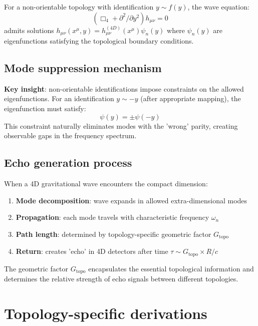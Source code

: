\documentclass[12pt]{iopart}
\begin{document}
For a non-orientable topology with identification $y \sim f(y)$, the wave equation:
\begin{equation}
(\Box_4 + \partial^2/\partial y^2)h_{\mu\nu} = 0
\end{equation}
admits solutions $h_{\mu\nu}(x^\mu, y) = h_{\mu\nu}^{(4D)}(x^\mu) \psi_n(y)$ where $\psi_n(y)$ are eigenfunctions satisfying the topological boundary conditions.

\subsection{Mode suppression mechanism}

\textbf{Key insight}: non-orientable identifications impose constraints on the allowed eigenfunctions. For an identification $y \sim -y$ (after appropriate mapping), the eigenfunction must satisfy:
\begin{equation}
\psi(y) = \pm\psi(-y)
\end{equation}
This constraint naturally eliminates modes with the 'wrong' parity, creating observable gaps in the frequency spectrum.

\subsection{Echo generation process}

When a 4D gravitational wave encounters the compact dimension:
\begin{enumerate}
\item \textbf{Mode decomposition}: wave expands in allowed extra-dimensional modes
\item \textbf{Propagation}: each mode travels with characteristic frequency $\omega_n$
\item \textbf{Path length}: determined by topology-specific geometric factor $G_{\mathrm{topo}}$
\item \textbf{Return}: creates 'echo' in 4D detectors after time $\tau \sim G_{\mathrm{topo}} \times R/c$
\end{enumerate}

The geometric factor $G_{\mathrm{topo}}$ encapsulates the essential topological information and determines the relative strength of echo signals between different topologies.

\section{Topology-specific derivations}
\end{document}
